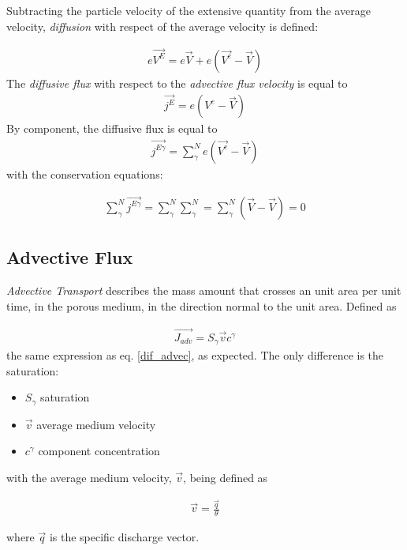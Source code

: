 \documentclass[11pt,twoside]{report}
\begin{document}
Subtracting the particle velocity of the extensive quantity from the average velocity, \textit{diffusion} with respect of the average velocity is defined:

\begin{align}\label{dif_advec}
   e\vec{V^{E}} = e\vec{V} + e\left(\vec{V^{e}} - \vec{V} \right)
\end{align}
The \textit{diffusive flux} with respect to the \textit{advective flux velocity} is equal to 
\begin{align}
   \vec{j^{E}} = e\left(V^{e} - \vec{V} \right)
\end{align}
By component, the diffusive flux is equal to 
\begin{align}
   \vec{j^{E\gamma}} =  \sum_{\gamma}^{N}e\left(\vec{V^{e}} - \vec{V} \right)
\end{align}
with the conservation equations:

\begin{align}
   \sum_{\gamma}^{N}\vec{j^{E\gamma}} =  \sum_{\gamma}^{N} \sum_{\gamma}^{N} = \sum_{\gamma}^{N}(\vec{V} - \vec{V}) = 0
\end{align}



\subsection{Advective Flux}
\textit{Advective Transport} describes the mass amount that crosses an unit area per unit time, in the porous medium, in the direction normal to the unit area. Defined as

\begin{align}
   \vec{J_{adv}} = S_{\gamma} \vec{v} c^{\gamma}
\end{align}
the same expression as eq. \eqref{dif_advec}, as expected. The only difference is the saturation:
\begin{itemize}
   \item $S_{\gamma}$ saturation
   \item $\vec{v}$ average medium velocity
   \item $c^{\gamma}$ component concentration
\end{itemize}
with the average medium velocity, $\vec{v}$, being defined as

\begin{align}
   \vec{v} = \frac{\vec{q}}{\theta}
\end{align}

where $\vec{q}$ is the specific discharge vector.
\end{document}
